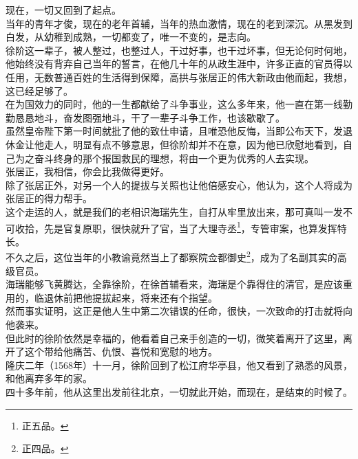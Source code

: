 \begin{multicols}{\theparacolNo}
现在，一切又回到了起点。\\

当年的青年才俊，现在的老年首辅，当年的热血激情，现在的老到深沉。从黑发到白发，从幼稚到成熟，一切都变了，唯一不变的，是志向。\\

徐阶这一辈子，被人整过，也整过人，干过好事，也干过坏事，但无论何时何地，他始终没有背弃自己当年的誓言，在他几十年的从政生涯中，许多正直的官员得以任用，无数普通百姓的生活得到保障，高拱与张居正的伟大新政由他而起，我想，这已经足够了。\\

在为国效力的同时，他的一生都献给了斗争事业，这么多年来，他一直在第一线勤勤恳恳地斗，奋发图强地斗，干了一辈子斗争工作，也该歇歇了。\\

虽然皇帝陛下第一时间就批了他的致仕申请，且唯恐他反悔，当即公布天下，发退休金让他走人，明显有点不够意思，但徐阶却并不在意，因为他已欣慰地看到，自己为之奋斗终身的那个报国救民的理想，将由一个更为优秀的人去实现。\\

张居正，我相信，你会比我做得更好。\\

除了张居正外，对另一个人的提拔与关照也让他倍感安心，他认为，这个人将成为张居正的得力帮手。\\

这个走运的人，就是我们的老相识海瑞先生，自打从牢里放出来，那可真叫一发不可收拾，先是官复原职，很快就升了官，当了大理寺丞\footnote{正五品。}，专管审案，也算发挥特长。\\

不久之后，这位当年的小教谕竟然当上了都察院佥都御史\footnote{正四品。}，成为了名副其实的高级官员。\\

海瑞能够飞黄腾达，全靠徐阶，在徐首辅看来，海瑞是个靠得住的清官，是应该重用的，临退休前把他提拔起来，将来还有个指望。\\

然而事实证明，这正是他人生中第二次错误的任命，很快，一次致命的打击就将向他袭来。\\

但此时的徐阶依然是幸福的，他看着自己亲手创造的一切，微笑着离开了这里，离开了这个带给他痛苦、仇恨、喜悦和宽慰的地方。\\

隆庆二年（1568年）十一月，徐阶回到了松江府华亭县，他又看到了熟悉的风景，和他离弃多年的家。\\

四十多年前，他从这里出发前往北京，一切就此开始，而现在，是结束的时候了。\\


\end{multicols}
